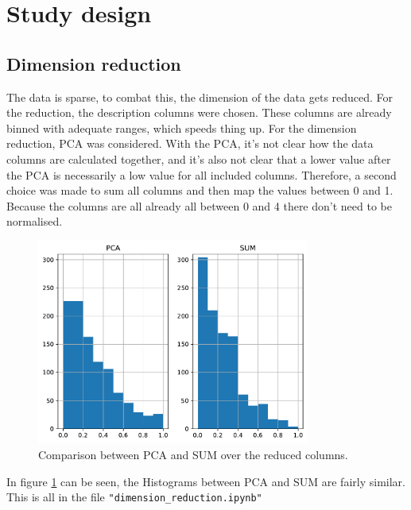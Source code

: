 \documentclass{article}
\newcommand\Plotwidth{0.8}
\begin{document}

\section{Study design}

\subsection{Dimension reduction}

The data is sparse, to combat this, the dimension of the data gets reduced. For the reduction, the description columns were chosen. These columns are already binned with adequate ranges, which speeds thing up. For the dimension reduction, PCA was considered. With the PCA, it's not clear how the data columns are calculated together, and it's also not clear that a lower value after the PCA is necessarily a low value for all included columns. Therefore, a second choice was made to sum all columns and then map the values between 0 and 1. Because the columns are all already all between 0 and 4 there don't need to be normalised.

\begin{figure}[h]
    \centering
    \includegraphics[width=\Plotwidth\textwidth]{Plots/PCA_SUM.pdf}
    \caption{Comparison between PCA and SUM over the reduced columns.}
    \label{fig:PCA_SUM}
\end{figure}

In figure \ref{fig:PCA_SUM} can be seen, the Histograms between PCA and SUM are fairly similar. This is all in the file \lstinline{"dimension_reduction.ipynb"}
\end{document}
